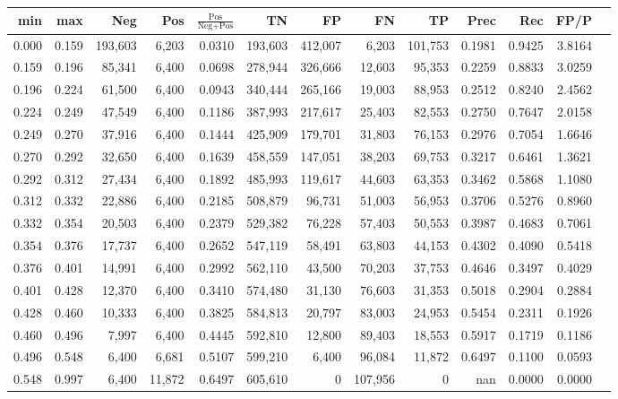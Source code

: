 \begin{tabular}{rrrrrrrrrrrrr}
\toprule
  min &   max &     Neg &    Pos & $\frac{\text{Pos}}{\text{Neg}+\text{Pos}}$ &      TN &      FP &      FN &      TP &   Prec &    Rec &   FP/P \\
\midrule
0.000 & 0.159 & 193,603 &  6,203 &                                     0.0310 & 193,603 & 412,007 &   6,203 & 101,753 & 0.1981 & 0.9425 & 3.8164 \\
0.159 & 0.196 &  85,341 &  6,400 &                                     0.0698 & 278,944 & 326,666 &  12,603 &  95,353 & 0.2259 & 0.8833 & 3.0259 \\
0.196 & 0.224 &  61,500 &  6,400 &                                     0.0943 & 340,444 & 265,166 &  19,003 &  88,953 & 0.2512 & 0.8240 & 2.4562 \\
0.224 & 0.249 &  47,549 &  6,400 &                                     0.1186 & 387,993 & 217,617 &  25,403 &  82,553 & 0.2750 & 0.7647 & 2.0158 \\
0.249 & 0.270 &  37,916 &  6,400 &                                     0.1444 & 425,909 & 179,701 &  31,803 &  76,153 & 0.2976 & 0.7054 & 1.6646 \\
0.270 & 0.292 &  32,650 &  6,400 &                                     0.1639 & 458,559 & 147,051 &  38,203 &  69,753 & 0.3217 & 0.6461 & 1.3621 \\
0.292 & 0.312 &  27,434 &  6,400 &                                     0.1892 & 485,993 & 119,617 &  44,603 &  63,353 & 0.3462 & 0.5868 & 1.1080 \\
0.312 & 0.332 &  22,886 &  6,400 &                                     0.2185 & 508,879 &  96,731 &  51,003 &  56,953 & 0.3706 & 0.5276 & 0.8960 \\
0.332 & 0.354 &  20,503 &  6,400 &                                     0.2379 & 529,382 &  76,228 &  57,403 &  50,553 & 0.3987 & 0.4683 & 0.7061 \\
0.354 & 0.376 &  17,737 &  6,400 &                                     0.2652 & 547,119 &  58,491 &  63,803 &  44,153 & 0.4302 & 0.4090 & 0.5418 \\
0.376 & 0.401 &  14,991 &  6,400 &                                     0.2992 & 562,110 &  43,500 &  70,203 &  37,753 & 0.4646 & 0.3497 & 0.4029 \\
0.401 & 0.428 &  12,370 &  6,400 &                                     0.3410 & 574,480 &  31,130 &  76,603 &  31,353 & 0.5018 & 0.2904 & 0.2884 \\
0.428 & 0.460 &  10,333 &  6,400 &                                     0.3825 & 584,813 &  20,797 &  83,003 &  24,953 & 0.5454 & 0.2311 & 0.1926 \\
0.460 & 0.496 &   7,997 &  6,400 &                                     0.4445 & 592,810 &  12,800 &  89,403 &  18,553 & 0.5917 & 0.1719 & 0.1186 \\
0.496 & 0.548 &   6,400 &  6,681 &                                     0.5107 & 599,210 &   6,400 &  96,084 &  11,872 & 0.6497 & 0.1100 & 0.0593 \\
0.548 & 0.997 &   6,400 & 11,872 &                                     0.6497 & 605,610 &       0 & 107,956 &       0 &    nan & 0.0000 & 0.0000 \\
\bottomrule
\end{tabular}
